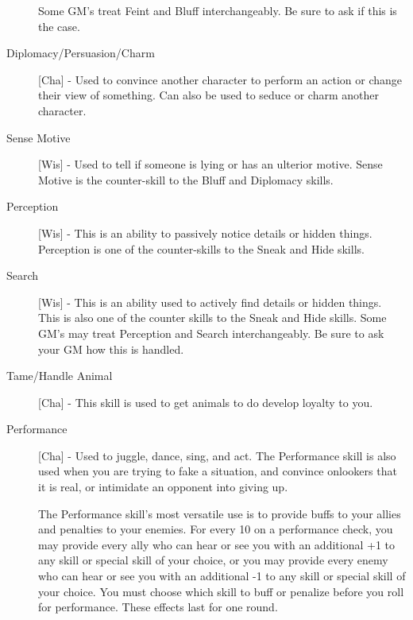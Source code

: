 \begin{description}
Some GM’s treat Feint and Bluff interchangeably. Be sure to ask if this is the case.
\item[Diplomacy/Persuasion/Charm] [Cha] - Used to convince another character to perform an action or change their view of something. Can also be used to seduce or charm another character.
\item[Sense Motive] [Wis] - Used to tell if someone is lying or has an ulterior motive. Sense Motive is the counter-skill to the Bluff and Diplomacy skills.
\item[Perception] [Wis] - This is an ability to passively notice details or hidden things. Perception is one of the counter-skills to the Sneak and Hide skills.
\item[Search] [Wis] - This is an ability used to actively find details or hidden things. This is also one of the counter skills to the Sneak and Hide skills. Some GM’s may treat Perception and Search interchangeably. Be sure to ask your GM how this is handled.
\item[Tame/Handle Animal] [Cha] - This skill is used to get animals to do develop loyalty to you.
\item[Performance] [Cha] - Used to juggle, dance, sing, and act. The Performance skill is also used when you are trying to fake a situation, and convince onlookers that it is real, or intimidate an opponent into giving up.

The Performance skill's most versatile use is to provide buffs to your allies and penalties to your enemies. For every 10 on a performance check, you may provide every ally who can hear or see you with an additional +1 to any skill or special skill of your choice, or you may provide every enemy who can hear or see you with an additional -1 to any skill or special skill of your choice. You must choose which skill to buff or penalize before you roll for performance. These effects last for one round.


\end{description}
